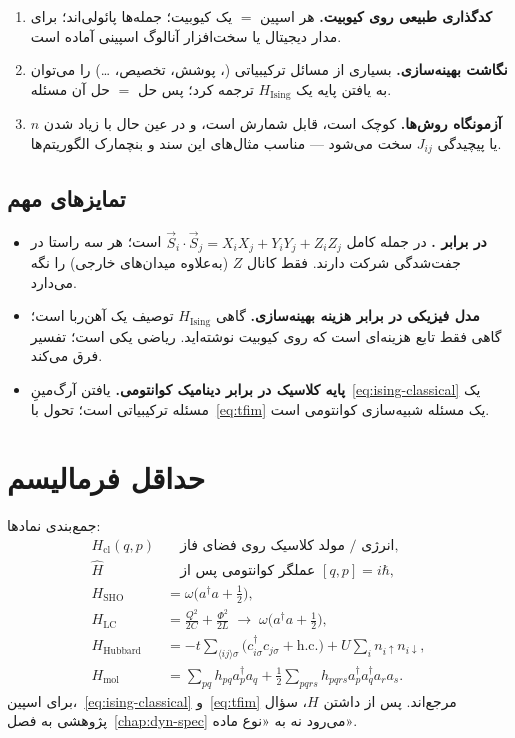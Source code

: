 \begin{enumerate}
	\item \textbf{کدگذاری طبیعی روی کیوبیت.} هر اسپین $=$ یک کیوبیت؛ جمله‌ها پائولی‌اند؛ برای مدار دیجیتال یا سخت‌افزار آنالوگ اسپینی آماده است.
	\item \textbf{نگاشت بهینه‌سازی.} بسیاری از مسائل ترکیبیاتی (، پوشش، تخصیص، \ldots) را می‌توان به یافتن پایه یک $H_{\mathrm{Ising}}$ ترجمه کرد؛ پس حل  $=$ حل آن مسئله.
	\item \textbf{آزمونگاه روش‌ها.} کوچک است، قابل شمارش است، و در عین حال با زیاد شدن $n$ یا پیچیدگی $J_{ij}$ سخت می‌شود --- مناسب مثال‌های این سند و بنچمارک الگوریتم‌ها.
\end{enumerate}

\subsection{تمایزهای مهم}

\begin{itemize}
	\item \textbf{ در برابر .} در  جمله کامل $\vec{S}_i\cdot\vec{S}_j=X_iX_j+Y_iY_j+Z_iZ_j$ است؛ هر سه راستا در جفت‌شدگی شرکت دارند.  فقط کانال $Z$ (به‌علاوه میدان‌های خارجی) را نگه می‌دارد.
	\item \textbf{مدل فیزیکی در برابر هزینه بهینه‌سازی.} گاهی $H_{\mathrm{Ising}}$ توصیف یک آهن‌ربا است؛ گاهی فقط تابع هزینه‌ای است که روی کیوبیت نوشته‌اید. ریاضی یکی است؛ تفسیر فرق می‌کند.
	\item \textbf{پایه کلاسیک در برابر دینامیک کوانتومی.} یافتن آرگ‌مینِ~\eqref{eq:ising-classical} یک مسئله ترکیبیاتی است؛ تحول با~\eqref{eq:tfim} یک مسئله شبیه‌سازی کوانتومی است.
\end{itemize}

\section{حداقل فرمالیسم}

جمع‌بندی نمادها:
\begin{align}
	H_{\mathrm{cl}}(q,p)
	&\quad\text{انرژی / مولد کلاسیک روی فضای فاز},\\
	\hat H
	&\quad\text{عملگر کوانتومی پس از }[q,p]=i\hbar,\\
	H_{\mathrm{SHO}}
	&=
	\omega\bigl(a^\dagger a+\tfrac12\bigr),\\
	H_{\mathrm{LC}}
	&=
	\frac{Q^2}{2C}+\frac{\Phi^2}{2L}
	\;\longrightarrow\;
	\omega\bigl(a^\dagger a+\tfrac12\bigr),\\
	H_{\mathrm{Hubbard}}
	&= -t\sum_{\langle ij\rangle\sigma}\bigl(c_{i\sigma}^\dagger c_{j\sigma}+\mathrm{h.c.}\bigr)
	+ U\sum_i n_{i\uparrow}n_{i\downarrow}, \\
	H_{\mathrm{mol}}
	&= \sum_{pq} h_{pq} a_p^\dagger a_q
	+ \tfrac12\sum_{pqrs} h_{pqrs} a_p^\dagger a_q^\dagger a_r a_s.
\end{align}
برای اسپین،~\eqref{eq:ising-classical} و~\eqref{eq:tfim} مرجع‌اند. پس از داشتن $H$، سؤال پژوهشی به فصل~\ref{chap:dyn-spec} می‌رود نه به «نوع ماده».

